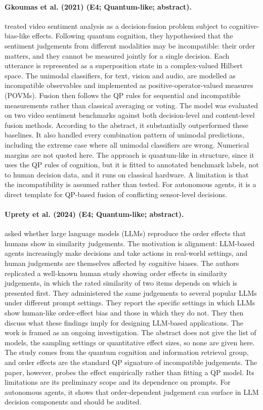 \documentclass[10pt,a4paper]{article}
\begin{document}
\paragraph{Gkoumas et al. (2021) (E4; Quantum-like; abstract).} \citet{Gkoumas2021} treated video sentiment analysis as a decision-fusion problem subject to cognitive-bias-like effects. Following quantum cognition, they hypothesised that the sentiment judgements from different modalities may be incompatible: their order matters, and they cannot be measured jointly for a single decision. Each utterance is represented as a superposition state in a complex-valued Hilbert space. The unimodal classifiers, for text, vision and audio, are modelled as incompatible observables and implemented as positive-operator-valued measures (POVMs). Fusion then follows the QP rules for sequential and incompatible measurements rather than classical averaging or voting. The model was evaluated on two video sentiment benchmarks against both decision-level and content-level fusion methods. According to the abstract, it substantially outperformed these baselines. It also handled every combination pattern of unimodal predictions, including the extreme case where all unimodal classifiers are wrong. Numerical margins are not quoted here. The approach is quantum-like in structure, since it uses the QP rules of cognition, but it is fitted to annotated benchmark labels, not to human decision data, and it runs on classical hardware. A limitation is that the incompatibility is assumed rather than tested. For autonomous agents, it is a direct template for QP-based fusion of conflicting sensor-level decisions.

\paragraph{Uprety et al. (2024) (E4; Quantum-like; abstract).} \citet{Uprety2024} asked whether large language models (LLMs) reproduce the order effects that humans show in similarity judgements. The motivation is alignment: LLM-based agents increasingly make decisions and take actions in real-world settings, and human judgements are themselves affected by cognitive biases. The authors replicated a well-known human study showing order effects in similarity judgements, in which the rated similarity of two items depends on which is presented first. They administered the same judgements to several popular LLMs under different prompt settings. They report the specific settings in which LLMs show human-like order-effect bias and those in which they do not. They then discuss what these findings imply for designing LLM-based applications. The work is framed as an ongoing investigation. The abstract does not give the list of models, the sampling settings or quantitative effect sizes, so none are given here. The study comes from the quantum cognition and information retrieval group, and order effects are the standard QP signature of incompatible judgements. The paper, however, probes the effect empirically rather than fitting a QP model. Its limitations are its preliminary scope and its dependence on prompts. For autonomous agents, it shows that order-dependent judgement can surface in LLM decision components and should be audited.
\end{document}
